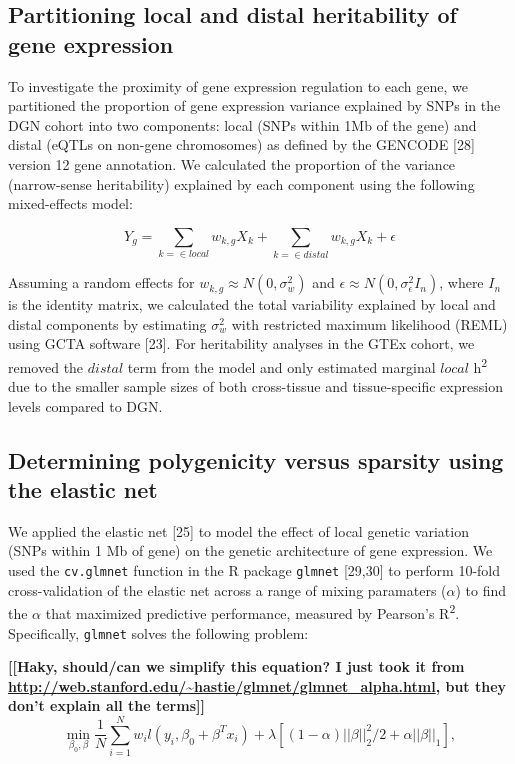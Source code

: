 \documentclass[]{article}
\begin{document}
\subsection{Partitioning local and distal heritability of gene
expression}\label{partitioning-local-and-distal-heritability-of-gene-expression}

To investigate the proximity of gene expression regulation to each gene,
we partitioned the proportion of gene expression variance explained by
SNPs in the DGN cohort into two components: local (SNPs within 1Mb of
the gene) and distal (eQTLs on non-gene chromosomes) as defined by the
GENCODE {[}28{]} version 12 gene annotation. We calculated the
proportion of the variance (narrow-sense heritability) explained by each
component using the following mixed-effects model:

\[ Y_g = \sum_{k = \in local}w_{k,g} X_k + \sum_{k = \in distal}w_{k,g} X_k + \epsilon \]

Assuming a random effects for \(w_{k,g} \approx N(0, \sigma^2_w)\) and
\(\epsilon \approx N(0, \sigma^2_{\epsilon} I_n)\), where \(I_n\) is the
identity matrix, we calculated the total variability explained by local
and distal components by estimating \(\sigma^2_w\) with restricted
maximum likelihood (REML) using GCTA software {[}23{]}. For heritability
analyses in the GTEx cohort, we removed the \(distal\) term from the
model and only estimated marginal \(local\) h\textsuperscript{2} due to
the smaller sample sizes of both cross-tissue and tissue-specific
expression levels compared to DGN.

\subsection{Determining polygenicity versus sparsity using the elastic
net}\label{determining-polygenicity-versus-sparsity-using-the-elastic-net}

We applied the elastic net {[}25{]} to model the effect of local genetic
variation (SNPs within 1 Mb of gene) on the genetic architecture of gene
expression. We used the \texttt{cv.glmnet} function in the R package
\texttt{glmnet} {[}29,30{]} to perform 10-fold cross-validation of the
elastic net across a range of mixing paramaters (\(\alpha\)) to find the
\(\alpha\) that maximized predictive performance, measured by Pearson's
R\textsuperscript{2}. Specifically, \texttt{glmnet} solves the following
problem:

\textbf{{[}{[}Haky, should/can we simplify this equation? I just took it
from \url{http://web.stanford.edu/~hastie/glmnet/glmnet_alpha.html}, but
they don't explain all the terms{]}{]}}
{\[\min_{\beta_0,\beta} \frac{1}{N} \sum_{i=1}^{N} w_i l(y_i,\beta_0+\beta^T x_i) + \lambda\left[(1-\alpha)||\beta||_2^2/2 + \alpha ||\beta||_1\right], \]}
\end{document}
